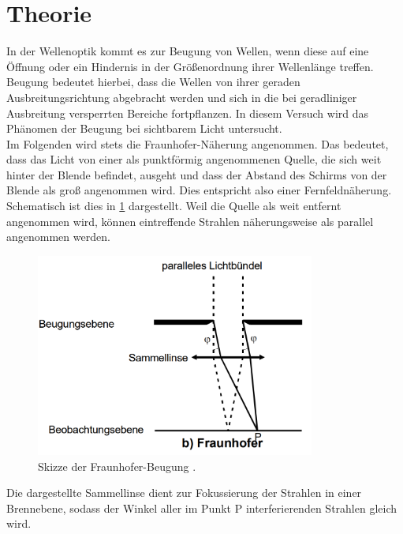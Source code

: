 \section{Theorie}
\label{sec:Theorie}
In der Wellenoptik kommt es zur Beugung von Wellen, wenn diese auf eine Öffnung oder
ein Hindernis in der Größenordnung ihrer Wellenlänge treffen. Beugung bedeutet hierbei,
dass die Wellen von ihrer geraden Ausbreitungsrichtung abgebracht werden und sich in
die bei geradliniger Ausbreitung versperrten Bereiche fortpflanzen. In diesem Versuch
wird das Phänomen der Beugung bei sichtbarem Licht untersucht. \\
Im Folgenden wird stets die Fraunhofer-Näherung angenommen. Das bedeutet, dass das Licht
von einer als punktförmig angenommenen Quelle, die sich weit hinter der Blende befindet,
ausgeht und dass der Abstand des Schirms von der Blende als groß angenommen wird. Dies
entspricht also einer Fernfeldnäherung. Schematisch ist dies in \ref{fig:fraunhofer}
dargestellt. Weil die Quelle als weit entfernt angenommen wird, können eintreffende
Strahlen näherungsweise als parallel angenommen werden.

\begin{figure}
  \centering
  \includegraphics[width=260pt]{data/fraunhofer.png}
  \caption{Skizze der Fraunhofer-Beugung \cite{Versuchsanleitung}.}
  \label{fig:fraunhofer}
\end{figure}

Die dargestellte Sammellinse dient zur Fokussierung der Strahlen in einer Brennebene,
sodass der Winkel aller im Punkt P interferierenden Strahlen gleich wird.


